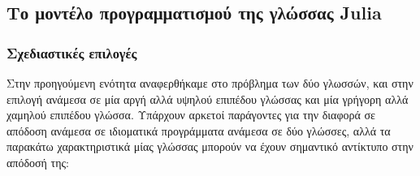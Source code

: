 \subsection{Το μοντέλο προγραμματισμού της γλώσσας Julia}

\subsubsection{Σχεδιαστικές επιλογές}

Στην προηγούμενη ενότητα αναφερθήκαμε στο πρόβλημα των δύο γλωσσών, και στην επιλογή ανάμεσα σε μία αργή αλλά υψηλού επιπέδου γλώσσας και μία γρήγορη αλλά χαμηλού επιπέδου γλώσσα.
Υπάρχουν αρκετοί παράγοντες για την διαφορά σε απόδοση ανάμεσα σε ιδιοματικά προγράμματα ανάμεσα σε δύο γλώσσες, αλλά τα παρακάτω χαρακτηριστικά μίας γλώσσας μπορούν να έχουν σημαντικό αντίκτυπο στην απόδοσή της:

